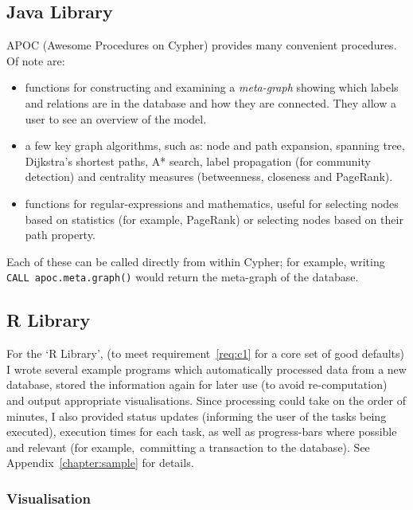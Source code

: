 \subsection{Java Library}

APOC (Awesome Procedures on Cypher) provides many convenient procedures. Of
note are:

\begin{itemize}

  \item functions for constructing and examining a \emph{meta-graph} showing
    which labels and relations are in the database and how they are connected.
    They allow a user to see an overview of the model.

  \item a few key graph algorithms, such as: node and path expansion, spanning
    tree, Dijkstra's shortest paths, A* search, label propagation (for community
    detection) and centrality measures (betweenness, closeness and PageRank).

  \item functions for regular-expressions and mathematics, useful for selecting
    nodes based on statistics (for example, PageRank) or selecting nodes based on their
    path property.

\end{itemize}

Each of these can be called directly from within Cypher; for example, writing
\texttt{CALL apoc.meta.graph()} would return the meta-graph of the database.

\subsection{R Library}

For the `R Library', (to meet requirement~\ref{req:c1} for a core set of good
defaults) I wrote several example programs which automatically processed data
from a new database, stored the information again for later use (to avoid
re-computation) and output appropriate visualisations.  Since processing could
take on the order of minutes, I also provided status updates (informing the user
of the tasks being executed), execution times for each task, as well as
progress-bars where possible and relevant (for example,\ committing a
transaction to the database). See Appendix~\ref{chapter:sample} for details.

\subsubsection{Visualisation}

